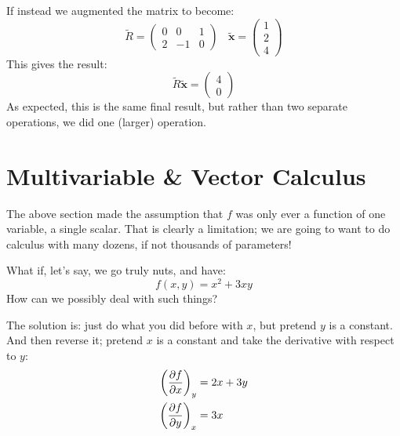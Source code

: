 \documentclass[a4paper,openany,11pt]{book}
\renewcommand\vec[1]{\boldsymbol{\mathbf{#1}}}
\begin{document}
						If instead we augmented the matrix to become:
						\begin{equation}
							\tilde{R} = \begin{pmatrix}
								0 & 0 & 1 \\ 2 & -1 & 0
							\end{pmatrix}~~~~ \tilde{\vec{x}} = \begin{pmatrix}
								1 \\ 2 \\ 4
							\end{pmatrix}
						\end{equation}
						This gives the result:
						\begin{equation}
							\tilde{R} \tilde{\vec{x}} = \begin{pmatrix}
								4 \\ 0 
							\end{pmatrix}
						\end{equation}
						As expected, this is the same final result, but rather than two separate operations, we did one (larger) operation.
		\chapter{Multivariable \& Vector Calculus}

			The above section made the assumption that $f$ was only ever a function of one variable, a single scalar. That is clearly a limitation; we are going to want to do calculus with many dozens, if not thousands of parameters!
			
			
			What if, let's say, we go truly nuts, and have:
			\begin{equation}
				f(x,y) = x^2 + 3xy
			\end{equation}
			How can we possibly deal with such things?
	
			The solution is: just do what you did before with $x$, but pretend $y$ is a constant. And then reverse it; pretend $x$ is a constant and take the derivative with respect to $y$:
			\begin{align}
				\left(\frac{\partial f}{\partial x} \right)_y& = 2x + 3 y
				\\
				\left(\frac{\partial f}{\partial y}\right)_x & = 3 x
			\end{align}
	
\end{document}
